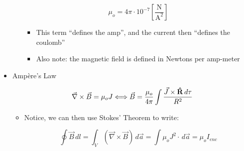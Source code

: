 \begin{itemize}
\begin{itemize}
        $$\mu_o=4\pi\cdot10^{-7}\left[ \frac{\si{\newton}}{\si{\ampere\squared}} \right]$$

        \begin{itemize}

          \item This term ``defines the amp'', and the current then ``defines the coulomb''

          \item Also note: the magnetic field is defined in Newtons per amp-meter

        \end{itemize}

    \end{itemize}

  \item Amp\`ere's Law

    $$\vec{\nabla}\times\vec{B}=\mu_oJ\Longleftrightarrow\vec{B}=\frac{\mu_o}{4\pi}\int\frac{\vec{J}\times\bold{\hat{R}}\,d\tau}{R^2}$$

    \begin{itemize}

      \item Notice, we can then use Stokes' Theorem to write:

        $$\oint\vec{B}\,dl=\int_V (\vec{\nabla}\times\vec{B})\,d\vec{a}=\int\mu_oJ^2\cdot\,d\vec{a}=\mu_oI_{enc}$$

    \end{itemize}

\end{itemize}




